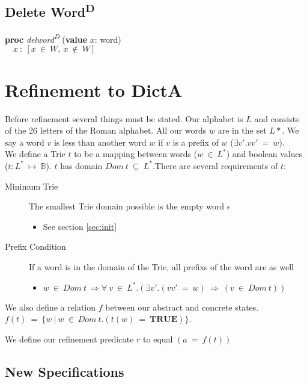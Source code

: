 \documentclass[a4paper, fleqn]{article}
\newcommand{\D}{\texorpdfstring{\textsuperscript{D}}{D}}
\begin{document}
\subsection{Delete Word\D}
\hspace*{10mm}\textbf{proc} \textit{delword\D} (\textbf{value} $x$: word) \\
\hspace*{20mm}$\quad x\ :\ [x\ \in\ W,\ x\ \notin\ W]$


\clearpage\section{Refinement to DictA}

Before refinement several things must be stated. Our alphabet is $L$ and consists of the 26 letters of the Roman alphabet. All our words $w$ are in the set $L*$. We say a word $v$ is less than another word $w$ if $v$ is a prefix of $w$ ($\exists v'.vv'\ =\ w$).  \\

We define a Trie $t$ to be a mapping between words ($w\ \in\ L^*$) and boolean values ($t: L^*\ \mapsto\ \mathbb{B}$). $t$ has domain $Dom\ t\ \subseteq\ L^*$.There are several requirements of $t$:
\begin{description}
		\item[Minimum Trie] The smallest Trie domain possible is the empty word $\epsilon$
				\begin{itemize}
						\item See section \ref{sec:init}
				\end{itemize}
		\item[Prefix Condition] If a word is in the domain of the Trie, all prefixs of the word are as well
				\begin{itemize}
						\item $w\ \in\ Dom\ t\ \Rightarrow \forall\ v\ \in\ L^*.(\exists v'.(vv'\ =\ w)\ \Rightarrow\ (v\ \in\ Dom\ t))$ 
				\end{itemize}
\end{description}

We also define a relation $f$ between our abstract and concrete states. $f(t)\ =\ \{w\ |\ w\ \in\ Dom\ t.(t(w)\ =\ \textbf{TRUE})\}$.

We define our refinement predicate $r$ to equal $(a\ =\ f(t))$

\subsection{New Specifications}
\end{document}
